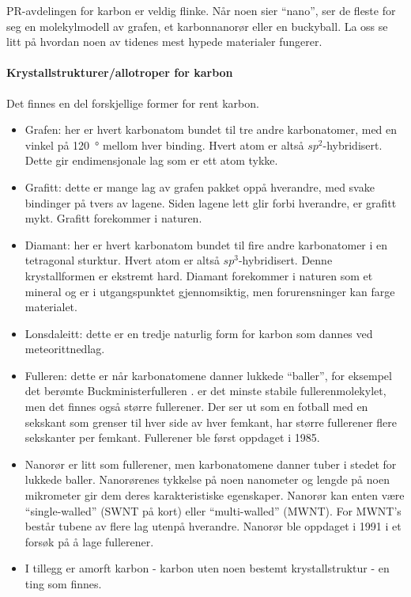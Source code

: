 PR-avdelingen for karbon er veldig flinke. Når noen sier ``nano'', ser de fleste for seg en molekylmodell av grafen, et karbonnanorør eller en buckyball. La oss se litt på hvordan noen av tidenes mest hypede materialer fungerer.

\paragraph{Krystallstrukturer/allotroper for karbon} Det finnes en del forskjellige former for rent karbon.
\begin{itemize}
	\item Grafen: her er hvert karbonatom bundet til tre andre karbonatomer, med en vinkel på \SI{120}{\degree} mellom hver binding. Hvert atom er altså $sp^2$-hybridisert. Dette gir endimensjonale lag som er ett atom tykke.
	\item Grafitt: dette er mange lag av grafen pakket oppå hverandre, med svake bindinger på tvers av lagene. Siden lagene lett glir forbi hverandre, er grafitt mykt. Grafitt forekommer i naturen.
	\item Diamant: her er hvert karbonatom bundet til fire andre karbonatomer i en tetragonal sturktur. Hvert atom er altså $sp^3$-hybridisert. Denne krystallformen er ekstremt hard. Diamant forekommer i naturen som et mineral og er i utgangspunktet gjennomsiktig, men forurensninger kan farge materialet.
	\item Lonsdaleitt: dette er en tredje naturlig form for karbon som dannes ved meteorittnedlag.
	\item Fulleren: dette er når karbonatomene danner lukkede ``baller'', for eksempel det berømte Buckministerfulleren .  er det minste stabile fullerenmolekylet, men det finnes også større fullerener. Der  ser ut som en fotball med en sekskant som grenser til hver side av hver femkant, har større fullerener flere sekskanter per femkant. Fullerener ble først oppdaget i 1985.
	\item Nanorør er litt som fullerener, men karbonatomene danner tuber i stedet for lukkede baller. Nanorørenes tykkelse på noen nanometer og lengde på noen mikrometer gir dem deres karakteristiske egenskaper. Nanorør kan enten være ``single-walled'' (SWNT på kort) eller ``multi-walled'' (MWNT). For MWNT's består tubene av flere lag utenpå hverandre. Nanorør ble oppdaget i 1991 i et forsøk på å lage fullerener.
	\item I tillegg er amorft karbon - karbon uten noen bestemt krystallstruktur - en ting som finnes.
\end{itemize}
\vfill
{}
